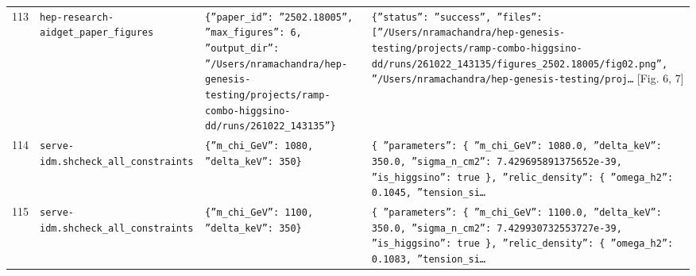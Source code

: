 \documentclass[11pt,a4paper]{article}
\begin{document}
\begin{longtable}{@{}p{}p{}p{}p{}@{}}
113 & \texttt{hep-research-aid}\newline\texttt{get\_\allowbreak{}paper\_\allowbreak{}figures} & \texttt{\{''paper\_\allowbreak{}id'':\allowbreak{} ''2502.18005'',\allowbreak{} ''max\_\allowbreak{}figures'':\allowbreak{} 6,\allowbreak{} ''output\_\allowbreak{}dir'':\allowbreak{} ''/\allowbreak{}Users/\allowbreak{}nramachandra/\allowbreak{}hep-genesis-testing/\allowbreak{}projects/\allowbreak{}ramp-combo-higgsino-dd/\allowbreak{}runs/\allowbreak{}261022\_\allowbreak{}143135''\}\allowbreak{}} & \texttt{\{''status'':\allowbreak{} ''success'',\allowbreak{} ''files'':\allowbreak{} [''/\allowbreak{}Users/\allowbreak{}nramachandra/\allowbreak{}hep-genesis-testing/\allowbreak{}projects/\allowbreak{}ramp-combo-higgsino-dd/\allowbreak{}runs/\allowbreak{}261022\_\allowbreak{}143135/\allowbreak{}figures\_\allowbreak{}2502.18005/\allowbreak{}fig02.png'',\allowbreak{} ''/\allowbreak{}Users/\allowbreak{}nramachandra/\allowbreak{}hep-genesis-testing/\allowbreak{}proj\ldots{}\allowbreak{}} [Fig. 6, 7] \\
114 & \texttt{serve-idm.sh}\newline\texttt{check\_\allowbreak{}all\_\allowbreak{}constraints} & \texttt{\{''m\_\allowbreak{}chi\_\allowbreak{}GeV'':\allowbreak{} 1080,\allowbreak{} ''delta\_\allowbreak{}keV'':\allowbreak{} 350\}\allowbreak{}} & \texttt{\{   ''parameters'':\allowbreak{} \{     ''m\_\allowbreak{}chi\_\allowbreak{}GeV'':\allowbreak{} 1080.0,\allowbreak{}     ''delta\_\allowbreak{}keV'':\allowbreak{} 350.0,\allowbreak{}     ''sigma\_\allowbreak{}n\_\allowbreak{}cm2'':\allowbreak{} 7.429695891375652e-39,\allowbreak{}     ''is\_\allowbreak{}higgsino'':\allowbreak{} true   \}\allowbreak{},\allowbreak{}   ''relic\_\allowbreak{}density'':\allowbreak{} \{     ''omega\_\allowbreak{}h2'':\allowbreak{} 0.1045,\allowbreak{}     ''tension\_\allowbreak{}si\ldots{}\allowbreak{}} \\
115 & \texttt{serve-idm.sh}\newline\texttt{check\_\allowbreak{}all\_\allowbreak{}constraints} & \texttt{\{''m\_\allowbreak{}chi\_\allowbreak{}GeV'':\allowbreak{} 1100,\allowbreak{} ''delta\_\allowbreak{}keV'':\allowbreak{} 350\}\allowbreak{}} & \texttt{\{   ''parameters'':\allowbreak{} \{     ''m\_\allowbreak{}chi\_\allowbreak{}GeV'':\allowbreak{} 1100.0,\allowbreak{}     ''delta\_\allowbreak{}keV'':\allowbreak{} 350.0,\allowbreak{}     ''sigma\_\allowbreak{}n\_\allowbreak{}cm2'':\allowbreak{} 7.429930732553727e-39,\allowbreak{}     ''is\_\allowbreak{}higgsino'':\allowbreak{} true   \}\allowbreak{},\allowbreak{}   ''relic\_\allowbreak{}density'':\allowbreak{} \{     ''omega\_\allowbreak{}h2'':\allowbreak{} 0.1083,\allowbreak{}     ''tension\_\allowbreak{}si\ldots{}\allowbreak{}} \\

\end{longtable}
\end{document}

